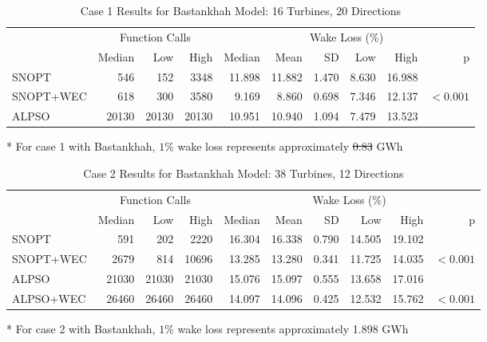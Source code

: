\documentclass[hidelinks,sort&compress,AMA,STIX1COL]{WileyNJD-v2}
\providecommand{\DIFadd}[1]{{\protect\color{blue}\uwave{#1}}} %
\providecommand{\DIFdel}[1]{{\protect\color{red}\sout{#1}}}                      %
\providecommand{\DIFaddFL}[1]{\DIFadd{#1}} %
\providecommand{\DIFdelFL}[1]{\DIFdel{#1}} %
\providecommand{\DIFaddbeginFL}{} %
\providecommand{\DIFaddendFL}{} %
\providecommand{\DIFdelbeginFL}{} %
\providecommand{\DIFdelendFL}{} %
\newcommand{\DIFscaledelfig}{0.5}
\newlength{\DIFdelgraphicswidth} %
\newlength{\DIFdelgraphicsheight} %
\newcommand{\DIFaddincludegraphics}[2][]{{\color{blue}\fbox{\DIFOincludegraphics[#1]{#2}}}} %
\newcommand{\DIFdelincludegraphics}[2][]{%
\sbox{\DIFdelgraphicsbox}{\DIFOincludegraphics[#1]{#2}}%
\settoboxwidth{\DIFdelgraphicswidth}{\DIFdelgraphicsbox} %
\settoboxtotalheight{\DIFdelgraphicsheight}{\DIFdelgraphicsbox} %
\scalebox{\DIFscaledelfig}{%
\parbox[b]{\DIFdelgraphicswidth}{\usebox{\DIFdelgraphicsbox}\\[-\baselineskip] \rule{\DIFdelgraphicswidth}{0em}}\llap{\resizebox{\DIFdelgraphicswidth}{\DIFdelgraphicsheight}{%
\setlength{\unitlength}{\DIFdelgraphicswidth}%
\begin{picture}(1,1)%
\thicklines\linethickness{2pt} %
{\color[rgb]{1,0,0}\put(0,0){\framebox(1,1){}}}%
{\color[rgb]{1,0,0}\put(0,0){\line( 1,1){1}}}%
{\color[rgb]{1,0,0}\put(0,1){\line(1,-1){1}}}%
\end{picture}%
}\hspace*{3pt}}} %
} %
\DeclareRobustCommand{\DIFaddbeginFL}{\DIFOaddbeginFL \let\includegraphics\DIFaddincludegraphics} %
\DeclareRobustCommand{\DIFaddendFL}{\DIFOaddendFL \let\includegraphics\DIFOincludegraphics} %
\DeclareRobustCommand{\DIFdelbeginFL}{\DIFOdelbeginFL \let\includegraphics\DIFdelincludegraphics} %
\DeclareRobustCommand{\DIFdelendFL}{\DIFOaddendFL \let\includegraphics\DIFOincludegraphics} %
\begin{document}
\begin{table}
	\centering
	\caption{Case 1 Results for Bastankhah Model: 16 Turbines, 20 Directions}
	\label{tab:case1}
	\begin{threeparttable}
	\begin{tabular}{lrrrrrrrrr}
		\toprule
		{} & \multicolumn{3}{c}{Function Calls} & \multicolumn{6}{c}{Wake Loss (\%)\tnote{*}} \\
		\cmidrule(lr){2-4} \cmidrule(lr){5-10}
		{} &         Median &    Low &   High &        Median &   Mean &    SD &   Low &   High &          p \\
		\cmidrule(lr){2-4} \cmidrule(lr){5-10}
		SNOPT     &            546 &    152 &   3348 &        11.898 & 11.882 & 1.470 & 8.630 & 16.988 &            \\
		SNOPT+WEC &            618 &    300 &   3580 &         9.169 &  8.860 & 0.698 & 7.346 & 12.137 &  $< 0.001$ \\
		ALPSO     &          20130 &  20130 &  20130 &        10.951 & 10.940 & 1.094 & 7.479 & 13.523 &            \\
		\bottomrule
	\end{tabular}
	\begin{tablenotes}
		\item[*]For case 1 with Bastankhah, $1\%$ wake loss represents approximately \DIFdelbeginFL \DIFdelFL{0.83 }\DIFdelendFL \DIFaddbeginFL \DIFaddFL{0.830 }\DIFaddendFL GWh
	\end{tablenotes}	
	\end{threeparttable}
\end{table}
\begin{table}
	\centering
	\caption{Case 2 Results for Bastankhah Model: 38 Turbines, 12 Directions}
	\label{tab:case2}
	\begin{threeparttable}
	\begin{tabular}{lrrrrrrrrr}
		\toprule
		{} & \multicolumn{3}{c}{Function Calls} & \multicolumn{6}{c}{Wake Loss (\%)\tnote{*}} \\
		\cmidrule(lr){2-4} \cmidrule(lr){5-10}
		{} &         Median &    Low &   High &        Median &   Mean &    SD &    Low &   High &          p \\
		\cmidrule(lr){2-4} \cmidrule(lr){5-10}
		SNOPT     &            591 &    202 &   2220 &        16.304 & 16.338 & 0.790 & 14.505 & 19.102 &            \\
		SNOPT+WEC &           2679 &    814 &  10696 &        13.285 & 13.280 & 0.341 & 11.725 & 14.035 &  $< 0.001$ \\
		ALPSO     &          21030 &  21030 &  21030 &        15.076 & 15.097 & 0.555 & 13.658 & 17.016 &            \\
		ALPSO+WEC &          26460 &  26460 &  26460 &        14.097 & 14.096 & 0.425 & 12.532 & 15.762 &  $< 0.001$ \\
		\bottomrule
	\end{tabular}
	\begin{tablenotes}
	\item[*] For case 2 with Bastankhah, $1\%$ wake loss represents approximately 1.898 GWh
	\end{tablenotes}		
	\end{threeparttable}
\end{table}
\end{document}
